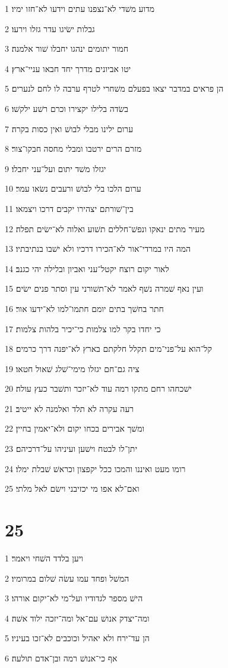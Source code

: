 \par 1 מדוע משׁדי לא־נצפנו עתים וידעו לא־חזו ימיו׃
\par 2 גבלות ישׂיגו עדר גזלו וירעו׃
\par 3 חמור יתומים ינהגו יחבלו שׁור אלמנה׃
\par 4 יטו אביונים מדרך יחד חבאו עניי־ארץ׃
\par 5 הן פראים במדבר יצאו בפעלם משׁחרי לטרף ערבה לו לחם לנערים׃
\par 6 בשׂדה בלילו יקצירו וכרם רשׁע ילקשׁו׃
\par 7 ערום ילינו מבלי לבושׁ ואין כסות בקרה׃
\par 8 מזרם הרים ירטבו ומבלי מחסה חבקו־צור׃
\par 9 יגזלו משׁד יתום ועל־עני יחבלו׃
\par 10 ערום הלכו בלי לבושׁ ורעבים נשׂאו עמר׃
\par 11 בין־שׁורתם יצהירו יקבים דרכו ויצמאו׃
\par 12 מעיר מתים ינאקו ונפשׁ־חללים תשׁוע ואלוה לא־ישׂים תפלה׃
\par 13 המה היו במרדי־אור לא־הכירו דרכיו ולא ישׁבו בנתיבתיו׃
\par 14 לאור יקום רוצח יקטל־עני ואביון ובלילה יהי כגנב׃
\par 15 ועין נאף שׁמרה נשׁף לאמר לא־תשׁורני עין וסתר פנים ישׂים׃
\par 16 חתר בחשׁך בתים יומם חתמו־למו לא־ידעו אור׃
\par 17 כי יחדו בקר למו צלמות כי־יכיר בלהות צלמות׃
\par 18 קל־הוא על־פני־מים תקלל חלקתם בארץ לא־יפנה דרך כרמים׃
\par 19 ציה גם־חם יגזלו מימי־שׁלג שׁאול חטאו׃
\par 20 ישׁכחהו רחם מתקו רמה עוד לא־יזכר ותשׁבר כעץ עולה׃
\par 21 רעה עקרה לא תלד ואלמנה לא ייטיב׃
\par 22 ומשׁך אבירים בכחו יקום ולא־יאמין בחיין׃
\par 23 יתן־לו לבטח וישׁען ועיניהו על־דרכיהם׃
\par 24 רומו מעט ואיננו והמכו ככל יקפצון וכראשׁ שׁבלת ימלו׃
\par 25 ואם־לא אפו מי יכזיבני וישׂם לאל מלתי׃

\chapter{25}

\par 1 ויען בלדד השׁחי ויאמר׃
\par 2 המשׁל ופחד עמו עשׂה שׁלום במרומיו׃
\par 3 הישׁ מספר לגדודיו ועל־מי לא־יקום אורהו׃
\par 4 ומה־יצדק אנושׁ עם־אל ומה־יזכה ילוד אשׁה׃
\par 5 הן עד־ירח ולא יאהיל וכוכבים לא־זכו בעיניו׃
\par 6 אף כי־אנושׁ רמה ובן־אדם תולעה׃

